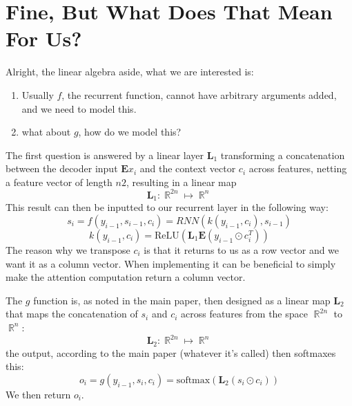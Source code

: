 \documentclass[12pt,a4paper]{article}
\DeclareMathOperator{\RR}{\mathbb{R}}
\begin{document}
\section{Fine, But What Does That Mean For Us?}
Alright, the linear algebra aside, what we are interested is:
\begin{enumerate}
	\item Usually $f$, the recurrent function, cannot have arbitrary arguments added, and we need to model this.
	\item what about $g$, how do we model this?
\end{enumerate}
The first question is answered by a linear layer $\mathbf{L}_1$ transforming a concatenation between the decoder input $\mathbf{E}x_i$ and the context vector $c_i$ across features, netting a feature vector of length $n2$, resulting in a linear map
$$
\mathbf{L}_1:\RR^{2n}\mapsto\RR^{n}
$$
This result can then be inputted to our recurrent layer in the following way:
$$
s_i=f(y_{i-1}, s_{i-1}, c_i)=RNN(k(y_{i-1}, c_i), s_{i-1})
$$
$$
k(y_{i-1}, c_i)=\text{ReLU}(\mathbf{L}_1\mathbf{E}(y_{i-1}\odot c_i^T))
$$
The reason why we transpose $c_i$ is that it returns to us as a row vector and we want it as a column vector. When implementing it can be beneficial to simply make the attention computation return a column vector.

The $g$ function is, as noted in the main paper, then designed as a linear map $\mathbf{L}_2$ that maps the concatenation of $s_i$ and $c_i$ across features from the space $\RR^{2n}$ to $\RR^{n}$:
$$
\mathbf{L}_2:\RR^{2n}\mapsto\RR^{n}
$$
the output, according to the main paper (whatever it's called) then softmaxes this:
$$
o_i=g(y_{i-1},s_i,c_i)=\text{softmax}(\mathbf{L}_2(s_i\odot c_i))
$$
We then return $o_i$.
\end{document}
